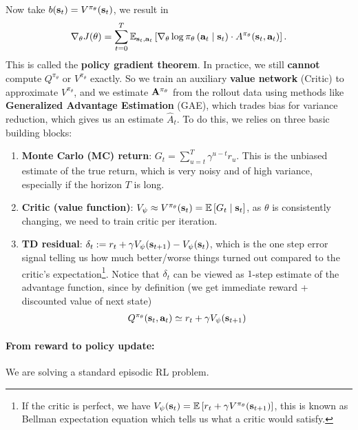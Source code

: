 \documentclass[11pt]{article}  %
\begin{document}
Now take $b(\mathbf{s}_t) = V^{\pi_\theta}(\mathbf{s}_t)$, we result in 
\begin{align*}
  \nabla_{\theta} J(\theta) = \sum_{t=0}^{T}\mathbb{E}_{\mathbf{s}_t, \mathbf{a}_t}\left[\nabla_{\theta}\log \pi_{\theta}\left( \mathbf{a}_t \mid \mathbf{s}_t \right)\cdot A^{\pi_\theta}(\mathbf{s}_t, \mathbf{a}_t)\right].
\end{align*}
This is called the \textbf{policy gradient theorem}.
In practice, we still \textbf{cannot} compute $Q^{\pi_{\theta}}$ or $V^{\pi_\theta}$ exactly. 
So we train an auxiliary \textbf{value network} (Critic) to approximate $V^{\pi_\theta}$, and we estimate $\mathbf{A}^{\pi_\theta}$ from the rollout data using methods like \textbf{Generalized Advantage Estimation} (GAE), which trades bias for variance reduction, which gives us an estimate $\hat{A}_t$.
To do this, we relies on three basic building blocks:
\begin{enumerate}
  \item \textbf{Monte Carlo (MC) return}: $G_t = \sum_{u=t}^{T}\gamma^{u - t}r_u$. 
  This is the unbiased estimate of the true return, which is very noisy and of high variance, especially if the horizon $T$ is long.

  \item \textbf{Critic (value function)}: $V_\psi \approx V^{\pi_\theta}(\mathbf{s}_t) = \mathbb{E}\left[G_t \mid \mathbf{s}_t\right]$, as $\theta$ is consistently changing, we need to train critic per iteration. 
  
  \item \textbf{TD residual}: $\delta_t := r_t + \gamma V_{\psi}(\mathbf{s}_{t+1}) - V_\psi(\mathbf{s}_t)$, which is the one step error signal telling us how much better/worse things turned out compared to the critic's expectation\footnote{If the critic is perfect, we have $V_{\psi}(\mathbf{s}_t) = \mathbb{E}\left[r_t + \gamma V^{\pi_\theta}(\mathbf{s}_{t+1})\right]$, this is known as Bellman expectation equation which tells us what a critic would satisfy.}.
  Notice that $\delta_t$ can be viewed as $1$-step estimate of the advantage function, since by definition (we get immediate reward + discounted value of next state)
  \begin{align*}
    Q^{\pi_\theta}(\mathbf{s}_t, \mathbf{a}_t) \simeq r_t + \gamma V_{\psi}(\mathbf{s}_{t+1})
  \end{align*}
\end{enumerate}

\paragraph{From reward to policy update:}
We are solving a standard episodic RL problem.
\end{document}
